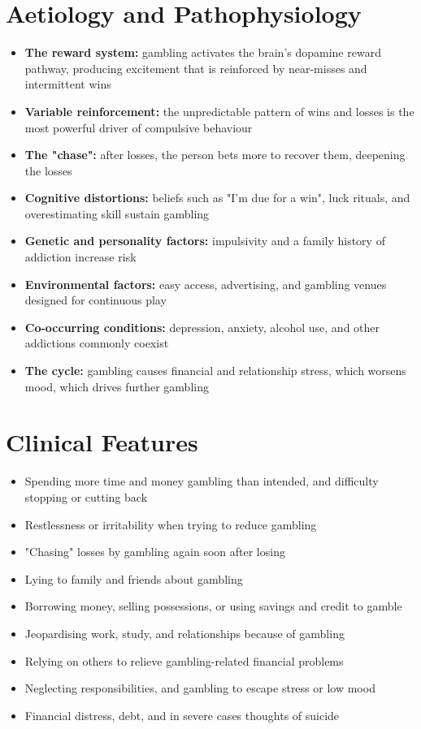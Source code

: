 \section*{Aetiology and Pathophysiology}
\begin{itemize}
    \item \textbf{The reward system:} gambling activates the brain's dopamine reward pathway, producing excitement that is reinforced by near-misses and intermittent wins
    \item \textbf{Variable reinforcement:} the unpredictable pattern of wins and losses is the most powerful driver of compulsive behaviour
    \item \textbf{The "chase":} after losses, the person bets more to recover them, deepening the losses
    \item \textbf{Cognitive distortions:} beliefs such as "I'm due for a win", luck rituals, and overestimating skill sustain gambling
    \item \textbf{Genetic and personality factors:} impulsivity and a family history of addiction increase risk
    \item \textbf{Environmental factors:} easy access, advertising, and gambling venues designed for continuous play
    \item \textbf{Co-occurring conditions:} depression, anxiety, alcohol use, and other addictions commonly coexist
    \item \textbf{The cycle:} gambling causes financial and relationship stress, which worsens mood, which drives further gambling
\end{itemize}

\section*{Clinical Features}
\begin{itemize}
    \item Spending more time and money gambling than intended, and difficulty stopping or cutting back
    \item Restlessness or irritability when trying to reduce gambling
    \item "Chasing" losses by gambling again soon after losing
    \item Lying to family and friends about gambling
    \item Borrowing money, selling possessions, or using savings and credit to gamble
    \item Jeopardising work, study, and relationships because of gambling
    \item Relying on others to relieve gambling-related financial problems
    \item Neglecting responsibilities, and gambling to escape stress or low mood
    \item Financial distress, debt, and in severe cases thoughts of suicide
\end{itemize}

